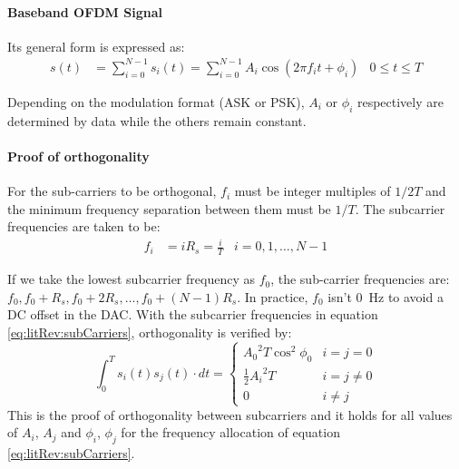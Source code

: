 \paragraph{Baseband OFDM Signal} Its general form is expressed as:
\begin{align*}
	s(t) &= \sum_{i=0}^{N-1}s_i(t) = \sum_{i=0}^{N-1}A_i \cos (2\pi f_i t + \phi_i) & 0 \leq t \leq T
\end{align*}
\begin{mathDef}
\end{mathDef}
Depending on the modulation format (\gls{ASK} or \gls{PSK}), \(A_i\) or \(\phi_i\) respectively are determined by data while the others remain constant.
\paragraph{Proof of orthogonality} For the sub-carriers to be orthogonal, \(f_i\) must be integer multiples of \(1/2T\) and the minimum frequency separation between them must be \(1/T\). The subcarrier frequencies are taken to be:
\begin{align}
	f_i &= iR_s = \frac{i}{T} & i = 0, 1, \ldots, N-1
	\label{eq:litRev:subCarriers}
\end{align}
\begin{mathDef}
\end{mathDef}
If we take the lowest subcarrier frequency as \(f_0\), the sub-carrier frequencies are: \(f_0, f_0 + R_s, f_0 + 2R_s, \ldots, f_0 + (N-1)R_s\). In practice, \(f_0\) isn't \SI{0}{\hertz} to avoid a DC offset in the \gls{DAC}.
With the subcarrier frequencies in equation \eqref{eq:litRev:subCarriers}, orthogonality is verified by:
\[
	\int_0^T s_i(t)s_j(t) \cdot dt =
	\begin{cases}
		{A_0}^2 T\cos^2 \phi_0 & i = j = 0 \\
		\frac{1}{2}{A_i}^2 T & i = j \neq 0 \\
		0 & i \neq j
	\end{cases}
\]
This is the proof of orthogonality between subcarriers and it holds for all values of \(A_i\), \(A_j\) and \(\phi_i\), \(\phi_j\) for the frequency allocation of equation \eqref{eq:litRev:subCarriers}\cite{ofdm_intro}.

